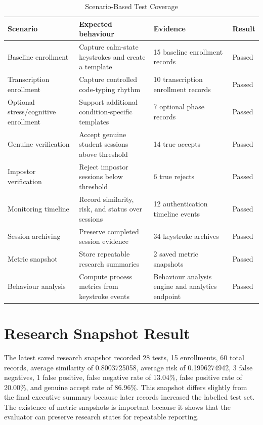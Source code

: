 \begin{table}[H]
  \centering
  \caption{Scenario-Based Test Coverage}
  \label{tab:test-scenarios}
  \begin{singlespace}
  \begin{tabularx}{\textwidth}{@{}p{3.2cm}p{5.5cm}p{3.5cm}p{1.6cm}@{}}
    \toprule
    \textbf{Scenario} & \textbf{Expected behaviour} & \textbf{Evidence} & \textbf{Result} \\
    \midrule
    Baseline enrollment & Capture calm-state keystrokes and create a template & 15 baseline enrollment records & Passed \\
    Transcription enrollment & Capture controlled code-typing rhythm & 10 transcription enrollment records & Passed \\
    Optional stress/cognitive enrollment & Support additional condition-specific templates & 7 optional phase records & Passed \\
    Genuine verification & Accept genuine student sessions above threshold & 14 true accepts & Passed \\
    Impostor verification & Reject impostor sessions below threshold & 6 true rejects & Passed \\
    Monitoring timeline & Record similarity, risk, and status over sessions & 12 authentication timeline events & Passed \\
    Session archiving & Preserve completed session evidence & 34 keystroke archives & Passed \\
    Metric snapshot & Store repeatable research summaries & 2 saved metric snapshots & Passed \\
    Behaviour analysis & Compute process metrics from keystroke events & Behaviour analysis engine and analytics endpoint & Passed \\
    \bottomrule
  \end{tabularx}
  \end{singlespace}
\end{table}

\section{Research Snapshot Result}
\label{sec:research-snapshot}

The latest saved research snapshot recorded 28 tests, 15 enrollments, 60 total records, average similarity of 0.8003725058, average risk of 0.1996274942, 3 false negatives, 1 false positive, false negative rate of 13.04\%, false positive rate of 20.00\%, and genuine accept rate of 86.96\%. This snapshot differs slightly from the final executive summary because later records increased the labelled test set. The existence of metric snapshots is important because it shows that the evaluator can preserve research states for repeatable reporting.

